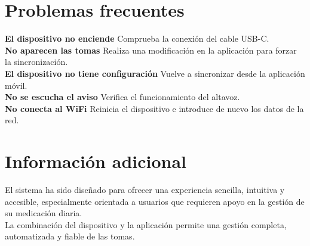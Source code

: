 \section{Problemas frecuentes}

\textbf{El dispositivo no enciende}
Comprueba la conexión del cable USB-C.\\

\textbf{No aparecen las tomas}
Realiza una modificación en la aplicación para forzar la sincronización.\\

\textbf{El dispositivo no tiene configuración}
Vuelve a sincronizar desde la aplicación móvil.\\

\textbf{No se escucha el aviso}
Verifica el funcionamiento del altavoz.\\

\textbf{No conecta al WiFi}
Reinicia el dispositivo e introduce de nuevo los datos de la red.\\

\section{Información adicional}

El sistema ha sido diseñado para ofrecer una experiencia sencilla, intuitiva y accesible, especialmente orientada a usuarios que requieren apoyo en la gestión de su medicación diaria.\\

La combinación del dispositivo y la aplicación permite una gestión completa, automatizada y fiable de las tomas.
